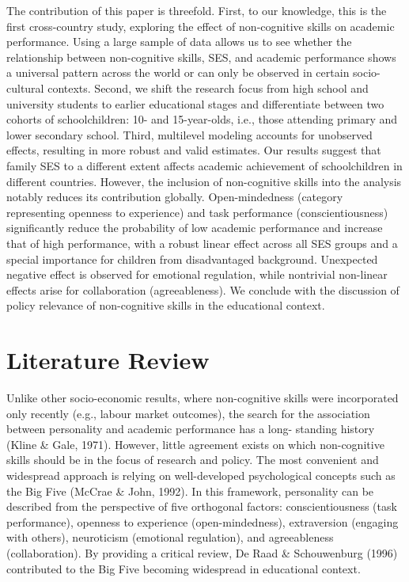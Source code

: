 \documentclass{article}
\begin{document}
The contribution of this paper is threefold. First, to our knowledge,
this is the first cross-country study, exploring the effect of
non-cognitive skills on academic performance. Using a large sample of
data allows us to see whether the relationship between non-cognitive
skills, SES, and academic performance shows a universal pattern across
the world or can only be observed in certain socio-cultural contexts.
Second, we shift the research focus from high school and university
students to earlier educational stages and differentiate between two
cohorts of schoolchildren: 10- and 15-year-olds, i.e., those attending
primary and lower secondary school. Third, multilevel modeling accounts
for unobserved effects, resulting in more robust and valid estimates.
Our results suggest that family SES to a different extent affects
academic achievement of schoolchildren in different countries. However,
the inclusion of non-cognitive skills into the analysis notably reduces
its contribution globally. Open-mindedness (category representing
openness to experience) and task performance (conscientiousness)
significantly reduce the probability of low academic performance and
increase that of high performance, with a robust linear effect across
all SES groups and a special importance for children from disadvantaged
background. Unexpected negative effect is observed for emotional
regulation, while nontrivial non-linear effects arise for collaboration
(agreeableness). We conclude with the discussion of policy relevance of
non-cognitive skills in the educational context.

\hypertarget{literature-review}{%
\section{Literature Review}\label{literature-review}}

Unlike other socio-economic results, where non-cognitive skills were
incorporated only recently (e.g., labour market outcomes), the search
for the association between personality and academic performance has a
long- standing history (Kline \& Gale, 1971). However, little agreement
exists on which non-cognitive skills should be in the focus of research
and policy. The most convenient and widespread approach is relying on
well-developed psychological concepts such as the Big Five (McCrae \&
John, 1992). In this framework, personality can be described from the
perspective of five orthogonal factors: conscientiousness (task
performance), openness to experience (open-mindedness), extraversion
(engaging with others), neuroticism (emotional regulation), and
agreeableness (collaboration). By providing a critical review, De Raad
\& Schouwenburg (1996) contributed to the Big Five becoming widespread
in educational context.
\end{document}
